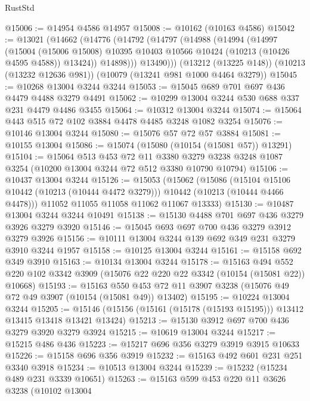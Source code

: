 \begin{lexlean}{RustStd}
\begin{coremodule}
{\begin{coremodule}
{{{{{{{{{{{{{{{{{{{{{{{{{{@15006 := @14954 @4586 @14957
@15008 := @10162 (@10163 @4586)
@15042 := @13021
    (@14662
      (@14776
        (@14792
          (@14797
            (@14988
              (@14994
                (@14997
                  (@15004
                    (@15006 @15008)
                    @10395
                    @10403
                    @10566
                    @10424
                    (@10213 (@10426 @4595 @4588))
                    @13424))
                @14898)))
          @13490)))
    (@13212 (@13225 @148))
    (@10213 (@13232 @12636 @981))
    (@10079 (@13241 @981 @1000 @4464 @3279))
@15045 := @10268 @13004 @3244 @3244
@15053 := @15045 @689 @701 @697 @436 @4479 @4488 @3279 @4491
@15062 := @10299 @13004 @3244 @530 @688 @337 @231 @4479 @4486 @3455
@15064 := @10312 @13004 @3244
@15074 := @15064 @443 @515 @72 @102 @3884 @4478 @4485 @3248 @1082 @3254
@15076 := @10146 @13004 @3244
@15080 := @15076 @57 @72 @57 @3884
@15081 := @10155 @13004
@15086 := @15074 (@15080 (@10154 (@15081 @57)) @13291)
@15104 := @15064
    @513
    @453
    @72
    @11
    @3380
    @3279
    @3238
    @3248
    @1087
    @3254
    (@10200 @13004 @3244 @72 @512 @3380 @10790 @10794)
@15106 := @10437 @13004 @3244
@15126 := @15053
    (@15062
      (@15086
        (@15104 @15106 @10442 (@10213 (@10444 @4472 @3279)))
        @10442
        (@10213 (@10444 @4466 @4478)))
      @11052
      @11055
      @11058
      @11062
      @11067
      @13333)
@15130 := @10487 @13004 @3244 @3244 @10491
@15138 := @15130 @4488 @701 @697 @436 @3279 @3926 @3279 @3920
@15146 := @15045 @693 @697 @700 @436 @3279 @3912 @3279 @3926
@15156 := @10111 @13004 @3244 @139 @692 @349 @231 @3279 @3910 @3244 @1957
@15158 := @10125 @13004 @3244
@15161 := @15158 @692 @349 @3910
@15163 := @10134 @13004 @3244
@15178 := @15163
    @494
    @552
    @220
    @102
    @3342
    @3909
    (@15076 @22 @220 @22 @3342 (@10154 (@15081 @22)) @10668)
@15193 := @15163
    @550
    @453
    @72
    @11
    @3907
    @3238
    (@15076 @49 @72 @49 @3907 (@10154 (@15081 @49)) @13402)
@15195 := @10224 @13004 @3244
@15205 := @15146 (@15156 (@15161 (@15178 (@15193 @15195))) @13412 @13415 @13418 @13421 @13424)
@15213 := @15130 @3912 @697 @700 @436 @3279 @3920 @3279 @3924
@15215 := @10619 @13004 @3244
@15217 := @15215 @486 @436
@15223 := @15217 @696 @356 @3279 @3919 @3915 @10633
@15226 := @15158 @696 @356 @3919
@15232 := @15163 @492 @601 @231 @251 @3340 @3918
@15234 := @10513 @13004 @3244
@15239 := @15232 (@15234 @489 @231 @3339 @10651)
@15263 := @15163
    @599
    @453
    @220
    @11
    @3626
    @3238
    (@10102
      @13004
}}}}}}}}}}}}}}}}}}}}}}}}}}
\end{coremodule}}
\end{coremodule}
\end{lexlean}
